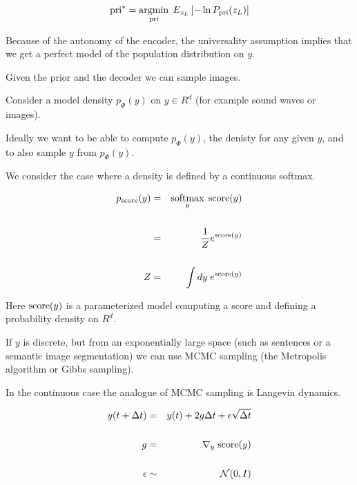 {

$$\mathrm{pri}^*   =  \operatorname*{argmin}_{\mathrm{pri}}\;E_{z_L}\left[-\ln P_{\mathrm{pri}}(z_L)\right]$$

\vfill
Because of the autonomy of the encoder, the universality assumption implies that we get a perfect model of the population distribution on $y$.

\vfill
Given the prior and the decoder we can sample images.


Consider a model density $p_\Phi(y)$ on $y \in R^d$ (for example sound waves or images).

\vfill
Ideally we want to be able to compute $p_\Phi(y)$, the denisty for any given $y$, and to also sample $y$ from $p_\Phi(y)$.


We consider the case where a density is defined by a continuous softmax.

\vfill
\begin{eqnarray*}
  p_{\mathrm{score}}(y) & = & \operatorname*{softmax}_y\; \mathrm{score}(y) \\
  \\
  & = & \frac{1}{Z} e^{\mathrm{score}(y)} \\
  \\
  Z & = & \int dy\;e^{\mathrm{score}(y)}
\end{eqnarray*}

\vfill
Here $\mathrm{score}(y)$ is a parameterized model computing a score and defining a probability density on $R^d$.


If $y$ is discrete, but from an exponentially large space (such as sentences or a semantic image segmentation) we can use MCMC sampling
(the Metropolis algorithm or Gibbs sampling).

\vfill
In the continuous case the analogue of MCMC sampling is Langevin dynamics.


\begin{eqnarray*}
y(t + \Delta t) & = & y(t) + 2g\Delta t +  \epsilon \sqrt{\Delta t} \\
\\
g & = & \nabla_y\;\mathrm{score}(y) \\
\\
\epsilon & \sim & {\cal N}(0,I)
\end{eqnarray*}

}
